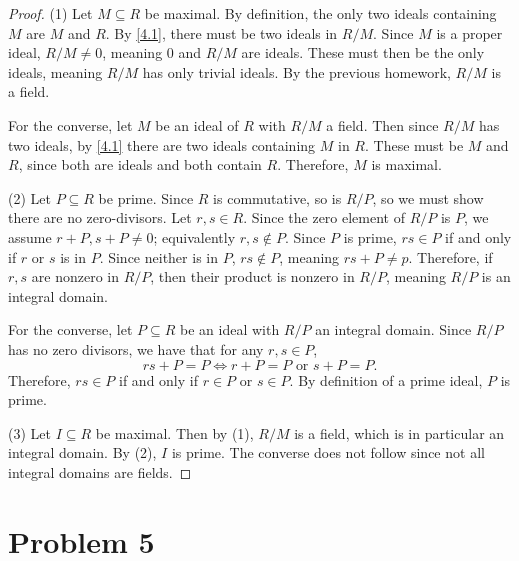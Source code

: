 \documentclass[11pt, letterpaper]{article}
\begin{document}
\begin{proof}
	(1) Let $M\subseteq R$ be maximal. By definition, the only two ideals containing $M$ are $M$ and $R$. By \cref{4.1}, there must be two ideals in $R/M$. Since $M$ is a proper ideal, $R/M \neq 0$, meaning $0$ and $R/M$ are ideals. These must then be the only ideals, meaning $R/M$ has only trivial ideals. By the previous homework, $R/M$ is a field.

	For the converse, let $M$ be an ideal of $R$ with $R/M$ a field. Then since $R/M$ has two ideals, by \cref{4.1} there are two ideals containing $M$ in $R$. These must be $M$ and $R$, since both are ideals and both contain $R$. Therefore, $M$ is maximal.

	(2) Let $P\subseteq R$ be prime. Since $R$ is commutative, so is $R/P$, so we must show there are no zero-divisors. Let $r,s\in R$. Since the zero element of $R/P$ is $P$, we assume $r+P,s+P \neq 0$; equivalently $r,s \notin P$. Since $P$ is prime, $rs\in P$ if and only if $r$ or $s$ is in $P$. Since neither is in $P$, $rs\notin P$, meaning $rs+P \neq p$. Therefore, if $r,s$ are nonzero in $R/P$, then their product is nonzero in $R/P$, meaning $R/P$ is an integral domain.

	For the converse, let $P\subseteq R$ be an ideal with $R/P$ an integral domain. Since $R/P$ has no zero divisors, we have that for any $r,s\in P$,
	\[
	rs+P = P \iff r+P=P \text{ or } s+P=P
	.\]
	Therefore, $rs\in P$ if and only if $r\in P$ or $s\in P$. By definition of a prime ideal, $P$ is prime.


	(3) Let $I\subseteq R$ be maximal. Then by (1), $R/M$ is a field, which is in particular an integral domain. By (2), $I$ is prime. The converse does not follow since not all integral domains are fields.
\end{proof}

\section{Problem 5}
\end{document}
